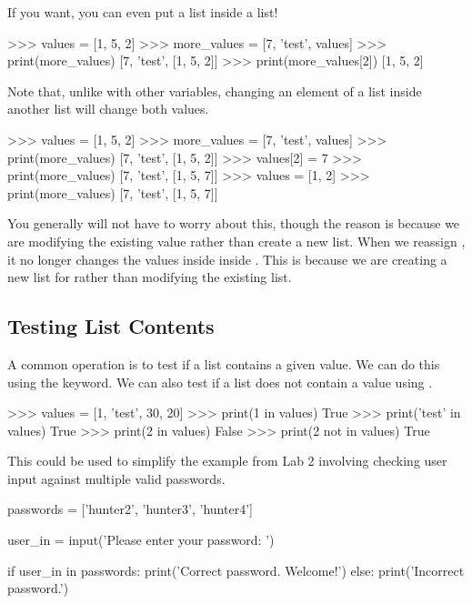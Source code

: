 \documentclass[11pt]{cselabheader}
\begin{document}
If you want, you can even put a list inside a list!

\begin{pyconcode}
>>> values = [1, 5, 2]
>>> more_values = [7, 'test', values]
>>> print(more_values)
[7, 'test', [1, 5, 2]]
>>> print(more_values[2])
[1, 5, 2]
\end{pyconcode}

Note that, unlike with other variables, changing an element of a list inside
another list will change both values.

\begin{pyconcode}
>>> values = [1, 5, 2]
>>> more_values = [7, 'test', values]
>>> print(more_values)
[7, 'test', [1, 5, 2]]
>>> values[2] = 7
>>> print(more_values)
[7, 'test', [1, 5, 7]]
>>> values = [1, 2]
>>> print(more_values)
[7, 'test', [1, 5, 7]]
\end{pyconcode}

You generally will not have to worry about this, though the reason is because we
are modifying the existing value rather than create a new list. When we reassign
, it no longer changes the values inside inside
. This is because we are creating a new list for
 rather than modifying the existing list.

\subsection{Testing List Contents}
A common operation is to test if a list contains a given value. We can do this
using the  keyword. We can also test if a list does not contain a
value using .

\begin{pyconcode}
>>> values = [1, 'test', 30, 20]
>>> print(1 in values)
True
>>> print('test' in values)
True
>>> print(2 in values)
False
>>> print(2 not in values)
True
\end{pyconcode}

This could be used to simplify the example from Lab 2 involving checking user
input against multiple valid passwords.

\begin{python3code}
passwords = ['hunter2', 'hunter3', 'hunter4']

user_in = input('Please enter your password: ')

if user_in in passwords:
    print('Correct password. Welcome!')
else:
    print('Incorrect password.')
\end{python3code}
\end{document}
